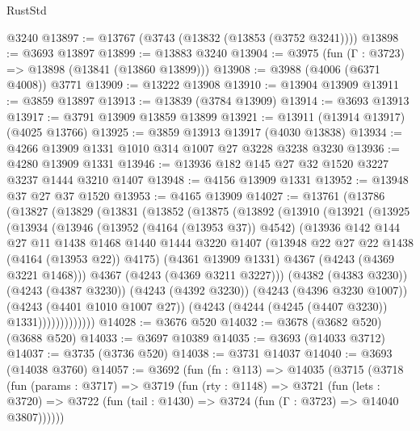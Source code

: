 \begin{lexlean}{RustStd}
\begin{coremodule}
    @3240
@13897 := @13767 (@3743 (@13832 (@13853 (@3752 @3241))))
@13898 := @3693 @13897
@13899 := @13883 @3240
@13904 := @3975 (fun (Γ : @3723) => @13898 (@13841 (@13860 @13899)))
@13908 := @3988 (@4006 (@6371 @4008)) @3771
@13909 := @13222 @13908
@13910 := @13904 @13909
@13911 := @3859 @13897
@13913 := @13839 (@3784 @13909)
@13914 := @3693 @13913
@13917 := @3791 @13909 @13859 @13899
@13921 := @13911 (@13914 @13917) (@4025 @13766)
@13925 := @3859 @13913 @13917 (@4030 @13838)
@13934 := @4266 @13909 @1331 @1010 @314 @1007 @27 @3228 @3238 @3230
@13936 := @4280 @13909 @1331
@13946 := @13936 @182 @145 @27 @32 @1520 @3227 @3237 @1444 @3210 @1407
@13948 := @4156 @13909 @1331
@13952 := @13948 @37 @27 @37 @1520
@13953 := @4165 @13909
@14027 := @13761
    (@13786
      (@13827
        (@13829
          (@13831
            (@13852
              (@13875
                (@13892
                  (@13910
                    (@13921
                      (@13925
                        (@13934
                          (@13946
                            (@13952 (@4164 (@13953 @37)) @4542)
                            (@13936
                              @142
                              @144
                              @27
                              @11
                              @1438
                              @1468
                              @1440
                              @1444
                              @3220
                              @1407
                              (@13948 @22 @27 @22 @1438 (@4164 (@13953 @22)) @4175)
                              (@4361 @13909 @1331)
                              @4367
                              (@4243 (@4369 @3221 @1468)))
                            @4367
                            (@4243 (@4369 @3211 @3227)))
                          (@4382 (@4383 @3230))
                          (@4243 (@4387 @3230))
                          (@4243 (@4392 @3230))
                          (@4243 (@4396 @3230 @1007))
                          (@4243 (@4401 @1010 @1007 @27))
                          (@4243 (@4244 (@4245 (@4407 @3230)) @1331)))))))))))))
@14028 := @3676 @520
@14032 := @3678 (@3682 @520) (@3688 @520)
@14033 := @3697 @10389
@14035 := @3693 (@14033 @3712)
@14037 := @3735 (@3736 @520)
@14038 := @3731 @14037
@14040 := @3693 (@14038 @3760)
@14057 := @3692
    (fun (fn : @113) =>
    @14035
      (@3715
        (@3718
          (fun (params : @3717) =>
          @3719
            (fun (rty : @1148) =>
            @3721
              (fun (lets : @3720) =>
              @3722 (fun (tail : @1430) => @3724 (fun (Γ : @3723) => @14040 @3807))))))

\end{coremodule}
\end{lexlean}
